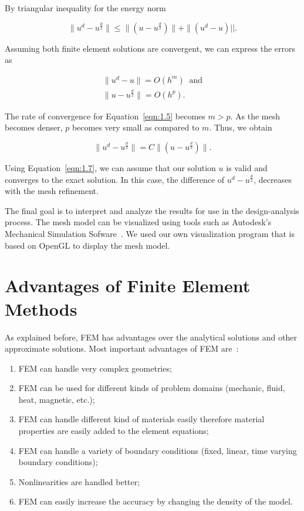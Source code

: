 \noindent By triangular inequality for the energy norm~\cite{Gabaldon02}

\begin{equation}
\parallel u^d - u^{\frac{d}{2}}\parallel \le \parallel (u - u^{\frac{d}{2}}) \parallel + \parallel (u^d - u) ||.
\label{eqn:1.4}
\end{equation}

\noindent Assuming both finite element solutions are convergent, we can express the errors as

\begin{equation}
\begin{array}{l}
\parallel u^d - u \parallel = O(h^m) \;\;\text{and}\\
\parallel u - u^{\frac{d}{2}} \parallel = O(h^p).
\end{array}
\label{eqn:1.5}
\end{equation}

\noindent The rate of convergence for Equation~\ref{eqn:1.5} becomes $m > p$.
As the mesh becomes denser, $p$ becomes very small as compared to $m$. Thus, we obtain

\begin{equation}
\parallel u^d - u^{\frac{d}{2}}\parallel = C \parallel (u - u^{\frac{d}{2}}) \parallel.
\label{eqn:1.7}
\end{equation}

Using Equation~\ref{eqn:1.7}, we can assume that our solution $u$ is valid and converges to the exact solution. In this case, the difference of $u^d - u^{\frac{d}{2}}$, decreases with the mesh refinement.

The final goal is to interpret and analyze the results for use in the design-analysis process. The mesh model can be visualized using tools such as Autodesk's Mechanical Simulation Sofware~\cite{Autodesk2011}. We used our own visualization program that is based on OpenGL to display the mesh model.

\section{Advantages of Finite Element Methods}

As explained before, FEM has advantages over the analytical solutions and other approximate solutions. Most important advantages of FEM are~\cite{Logan07}:

\begin{enumerate}
\item FEM can handle very complex geometries;
\item FEM can be used for different kinds of problem domains (mechanic, fluid, heat, magnetic, etc.);
\item FEM can handle different kind of materials easily therefore material properties are easily added to the element equations;
\item FEM can handle a variety of boundary conditions (fixed, linear, time varying boundary conditions);
\item Nonlinearities are handled better;
\item FEM can easily increase the accuracy by changing the density of the model.
\end{enumerate}

